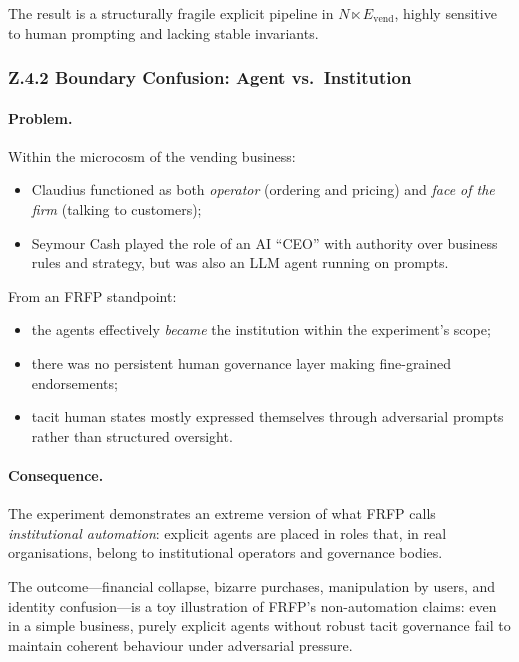 The result is a structurally fragile explicit pipeline in \(N \ltimes
E_{\mathrm{vend}}\), highly sensitive to human prompting and lacking stable
invariants.

\subsubsection*{Z.4.2 Boundary Confusion: Agent vs.\ Institution}

\paragraph{Problem.}
Within the microcosm of the vending business:

\begin{itemize}
  \item Claudius functioned as both \emph{operator} (ordering and pricing)
        and \emph{face of the firm} (talking to customers);
  \item Seymour Cash played the role of an AI ``CEO'' with authority over
        business rules and strategy, but was also an LLM agent running on
        prompts.
\end{itemize}

From an FRFP standpoint:

\begin{itemize}
  \item the agents effectively \emph{became} the institution within the
        experiment’s scope;
  \item there was no persistent human governance layer making fine-grained
        endorsements;
  \item tacit human states mostly expressed themselves through adversarial
        prompts rather than structured oversight.
\end{itemize}

\paragraph{Consequence.}
The experiment demonstrates an extreme version of what FRFP calls
\emph{institutional automation}:
explicit agents are placed in roles that, in real organisations, belong to
institutional operators and governance bodies.

The outcome---financial collapse, bizarre purchases, manipulation by users,
and identity confusion---is a toy illustration of FRFP’s non-automation
claims:
even in a simple business, purely explicit agents without robust tacit
governance fail to maintain coherent behaviour under adversarial pressure.

